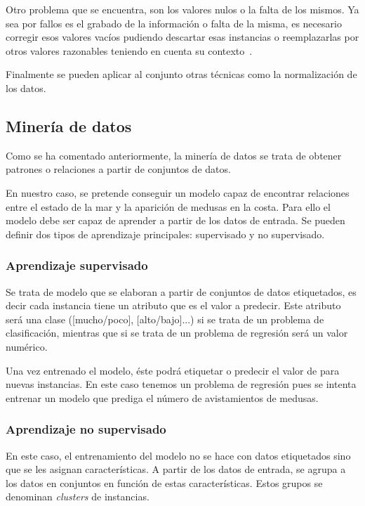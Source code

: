 Otro problema que se encuentra, son los valores nulos o la falta de los mismos. Ya sea por fallos es el grabado de la información o falta de la misma, es necesario corregir esos valores vacíos pudiendo descartar esas instancias o reemplazarlas por otros valores razonables teniendo en cuenta su contexto~\cite{libro_mineria}.

Finalmente se pueden aplicar al conjunto otras técnicas como la normalización de los datos.

\subsection{Minería de datos}
Como se ha comentado anteriormente, la minería de datos se trata de obtener patrones o relaciones a partir de conjuntos de datos.

En nuestro caso, se pretende conseguir un modelo capaz de encontrar relaciones entre el estado de la mar y la aparición de medusas en la costa. Para ello el modelo debe ser capaz de aprender a partir de los datos de entrada. Se pueden definir dos tipos de aprendizaje principales: supervisado y no supervisado.

\subsubsection{Aprendizaje supervisado}
Se trata de modelo que se elaboran a partir de conjuntos de datos etiquetados, es decir cada instancia tiene un atributo que es el valor a predecir. Este atributo será una clase ([mucho/poco], [alto/bajo]...) si se trata de un problema de clasificación, mientras que si se trata de un problema de regresión será un valor numérico.

Una vez entrenado el modelo, éste podrá etiquetar o predecir el valor de para nuevas instancias.
En este caso tenemos un problema de regresión pues se intenta entrenar un modelo que prediga el número de avistamientos de medusas.

\subsubsection{Aprendizaje no supervisado}
En este caso, el entrenamiento del modelo no se hace con datos etiquetados sino que se les asignan características. A partir de los datos de entrada, se agrupa a los datos en conjuntos en función de estas características. Estos grupos se denominan \emph{clusters} de instancias.

